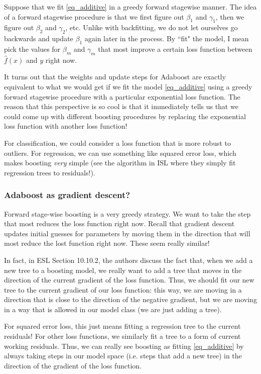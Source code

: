 Suppose that we fit \eqref{eq_additive} in a greedy forward stagewise manner. The idea of a forward stagewise procedure is that we first figure out $\beta_1$ and $\gamma_1$, then we figure out $\beta_2$ and $\gamma_2$, etc. Unlike with backfitting, we do not let ourselves go backwards and update $\beta_1$ again later in the process. By ``fit" the model, I mean pick the values for $\beta_m$ and $\gamma_m$ that most improve a certain loss function between $\hat{f}(x)$ and $y$ right now. 

It turns out that the weights and update steps for Adaboost are exactly equivalent to what we would get if we fit the model \eqref{eq_additive} using a greedy forward stagewise procedure with a particular exponential loss function. The reason that this perspective is so cool is that it immediately tells us that we could come up with different boosting procedures by replacing the exponential loss function with another loss function! 

For classification, we could consider a loss function that is more robust to outliers. For regression, we can use something like squared error loss, which makes boosting \emph{very} simple (see the algorithm in ISL where they simply fit regression trees to residuals!). 

\subsubsection{Adaboost as gradient descent?}

Forward stage-wise boosting is a very greedy strategy. We want to take the step that most reduces the loss function right now. Recall that gradient descent updates initial guesses for parameters by moving them in the direction that will most reduce the lost function right now. These seem really similar! 

In fact, in ESL Section 10.10.2, the authors discuss the fact that, when we add a new tree to a boosting model, we really want to add a tree that moves in the direction of the current gradient of the loss function. Thus, we should fit our new tree to the current gradient of our loss function: this way, we are moving in a direction that is close to the direction of the negative gradient, but we are moving in a way that is allowed in our model class (we are just adding a tree). 

For squared error loss, this just means fitting a regression tree to the current residuals! For other loss functions, we similarly fit a tree to a form of current working residuals. Thus, we can really see boosting as fitting \eqref{eq_additive} by always taking steps in our model space (i.e. steps that add a new tree) in the direction of the gradient of the loss function. 

